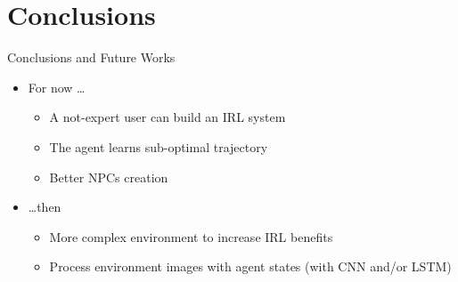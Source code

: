 \section{Conclusions}

\begin{frame}{Conclusions and Future Works}

\begin{itemize}
	\item For now \ldots
	\begin{itemize}
		\item A not-expert user can build an IRL system
		\item The agent learns sub-optimal trajectory 
		\item Better NPCs creation
	\end{itemize}
	\vspace{0.5cm}
	\item \ldots then
	\begin{itemize}
		\item More complex environment to increase IRL benefits
		\item Process environment images with agent states (with CNN and/or LSTM)
	\end{itemize}
\end{itemize}

\end{frame}
